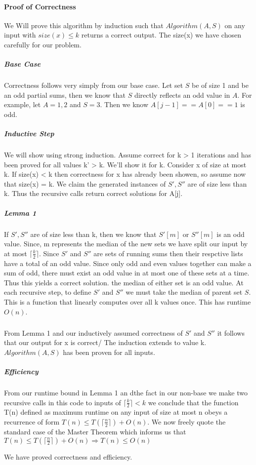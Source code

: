 \documentclass[10pt]{article}
\begin{document}
{\paragraph{Proof of Correctness} We Will prove this algorithm by induction such that $Algorithm(A, S)$ on any input with $size(x) \leq k$ returns a correct output. The size(x) we have chosen
carefully for our problem. 

\subparagraph{Base Case} Correctness follows very simply from our base case. Let set $S$ be of size 1 and be an odd partial sums, then we know that $S$ directly reflects an odd value in $A$. For example,
let $A = {1,2}$ and $S = {3}$. Then we know $A[j-1] == A[0] == 1$ is odd. 

\subparagraph{Inductive Step} We will show using strong induction. Assume correct for k > 1 iterations and has been 
proved for all values k' > k. We'll show it for k. Consider x of size at most k. If size(x) < k then correctness for x has already been showen, so assume now that size(x) = k. 
We claim the generated instances of $S', S''$ are of size less than k. Thus the recursive calls return correct solutions for A[j]. 

\subparagraph{Lemma 1} If $S', S''$ are of size less than k, then we know that $S'[m]$ or $S''[m]$ is an odd value. Since, m represents the median of the new sets we have 
split our input by at most $\lceil \frac{k}{2} \rceil$. Since $S'$ and $S''$ are sets of running sums then their respctive lists have a total of an odd value. Since only odd and even values together
can make a sum of odd, there must exist an odd value in at most one of these sets at a time. Thus this yields a correct solution. the median of either set is an odd value. At each recursive step, to define 
$S'$ and $S''$ we must take the median of parent set $S$. This is a function that linearly computes over all k values once. This has runtime $O(n)$.

\subparagraph{}From Lemma 1 and our inductively assumed correctness of $S'$ and $S''$ it follows that our output for x is correct/ The induction extends to value k. $Algorithm(A, S)$ has been proven for all inputs. 

\subparagraph{Efficiency} From our runtime bound in Lemma 1 an dthe fact in our non-base we make two recursive calls in this code to inputs of $\lceil \frac{k}{2} \rceil < k$ we conclude that 
the function T(n) defined as maximum runtime on any input of size at most n obeys a recurrence of form $T(n) \leq T(\lceil \frac{n}{2} \rceil) + O(n)$. 
We now freely quote the standard case of the Master Theorem which informs us that  $T(n) \leq T(\lceil \frac{n}{2} \rceil) + O(n) \Rightarrow T(n) \leq O(n)$

We have proved correctness and efficiency. 
}
\end{document}
